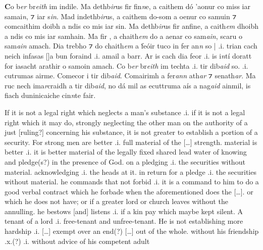\documentclass[11pt]{article}
\begin{document}
\begin{pages}
\begin{Leftside}
    \pstart
    \textbf{C}o b\emph{er} br\emph{eith} im indile. Ma dethb\emph{ir}us fir fin\emph{n}e, a caithem d\'{o} 'aonur co miss iar samai\emph{n}, ⁊  iar s\emph{in}.  Mad indethb\emph{ir}us, a caithem do-som a oenur co samuin ⁊ comcaithim doibh a ndis co mis iar sin.  Ma dethb\emph{ir}us fir anfine, a caith\emph{em} dhoibh a ndis co mis iar samhain.  Ma  fir , a chaith\emph{em} do a aenar co sam\emph{ain}, scaru o sam\emph{ain} amach.  Dia trebho ⁊ do chaith\emph{em} a \.{f}e\'{o}ir tuco in fer an\emph{n} so | .i. trian cach neich infasas [\hspace{2mm}]a bun foraind .i. amail a barr.  Ar is cach dia feor .i. is i\emph{n}t\'{i} doratt for iasacht  arathir o samoin amach.  Co b\emph{er} br\emph{eith} im techta .i. tir dib\emph{aid} so.   .i. cutrumas airme.  Comecor i tir dib\emph{aid}.  Comairimh a fer\emph{ann} ath\emph{ar} ⁊ senath\emph{ar}.  Ma ruc nech ima\emph{r}craidh a tir dib\emph{aid}, no d\'{a} mil as ecuttruma a\'{i}s a nag\emph{aid} ainmil, is fiach duninicaiche cin\emph{n}te fair.
    \pend
  \endnumbering
  \end{Leftside}

\begin{Rightside}
    \beginnumbering
    \pstart
    If it is not a legal right which neglects a man's substance .i. if it is not a legal right which it may do, strongly neglecting the other man on the authority of a just [ruling?] concerning his substance, it is not greater to establish a portion of a security.  For strong men are better .i. full material of the [\ldots] strength. material is better .i. it is better material of the legally fixed shared lead water of knowing and pledge(s?) in the presence of God.  on a pledging .i. the securities without material. acknowledging .i. the heads at it.  in return for a pledge .i. the securities without material.  he commands that not forbid .i. it is a command to him to do a good verbal contract which he forbade when the aforementioned does the [\ldots].  or which he does not have; or if a greater lord or church leaves without the annulling.  he bestows [and] listens .i. if a kin pay which maybe kept silent.  A tenant of a lord .i. free-tenant and unfree-tenant. He is not establishing more hardship .i. [\ldots] exempt over an end(?) [\ldots] out of the whole.  without his friendship .x.(?) .i. without advice of his competent adult 
    \pend
    

\end{Rightside}
\end{pages}
\end{document}
